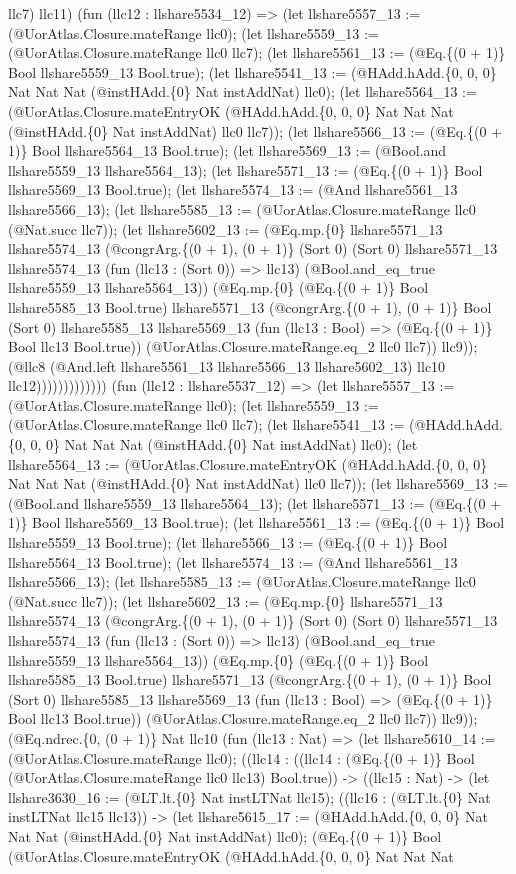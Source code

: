 \documentclass[11pt]{article}
\begin{document}
llc7) llc11) (fun (llc12 : llshare5534\_12) => (let llshare5557\_13 := (@UorAtlas.Closure.mateRange llc0); (let llshare5559\_13 := (@UorAtlas.Closure.mateRange llc0 llc7); (let llshare5561\_13 := (@Eq.\{(0 + 1)\} Bool llshare5559\_13 Bool.true); (let llshare5541\_13 := (@HAdd.hAdd.\{0, 0, 0\} Nat Nat Nat (@instHAdd.\{0\} Nat instAddNat) llc0); (let llshare5564\_13 := (@UorAtlas.Closure.mateEntryOK (@HAdd.hAdd.\{0, 0, 0\} Nat Nat Nat (@instHAdd.\{0\} Nat instAddNat) llc0 llc7)); (let llshare5566\_13 := (@Eq.\{(0 + 1)\} Bool llshare5564\_13 Bool.true); (let llshare5569\_13 := (@Bool.and llshare5559\_13 llshare5564\_13); (let llshare5571\_13 := (@Eq.\{(0 + 1)\} Bool llshare5569\_13 Bool.true); (let llshare5574\_13 := (@And llshare5561\_13 llshare5566\_13); (let llshare5585\_13 := (@UorAtlas.Closure.mateRange llc0 (@Nat.succ llc7)); (let llshare5602\_13 := (@Eq.mp.\{0\} llshare5571\_13 llshare5574\_13 (@congrArg.\{(0 + 1), (0 + 1)\} (Sort 0) (Sort 0) llshare5571\_13 llshare5574\_13 (fun (llc13 : (Sort 0)) => llc13) (@Bool.and\_eq\_true llshare5559\_13 llshare5564\_13)) (@Eq.mp.\{0\} (@Eq.\{(0 + 1)\} Bool llshare5585\_13 Bool.true) llshare5571\_13 (@congrArg.\{(0 + 1), (0 + 1)\} Bool (Sort 0) llshare5585\_13 llshare5569\_13 (fun (llc13 : Bool) => (@Eq.\{(0 + 1)\} Bool llc13 Bool.true)) (@UorAtlas.Closure.mateRange.eq\_2 llc0 llc7)) llc9)); (@llc8 (@And.left llshare5561\_13 llshare5566\_13 llshare5602\_13) llc10 llc12))))))))))))) (fun (llc12 : llshare5537\_12) => (let llshare5557\_13 := (@UorAtlas.Closure.mateRange llc0); (let llshare5559\_13 := (@UorAtlas.Closure.mateRange llc0 llc7); (let llshare5541\_13 := (@HAdd.hAdd.\{0, 0, 0\} Nat Nat Nat (@instHAdd.\{0\} Nat instAddNat) llc0); (let llshare5564\_13 := (@UorAtlas.Closure.mateEntryOK (@HAdd.hAdd.\{0, 0, 0\} Nat Nat Nat (@instHAdd.\{0\} Nat instAddNat) llc0 llc7)); (let llshare5569\_13 := (@Bool.and llshare5559\_13 llshare5564\_13); (let llshare5571\_13 := (@Eq.\{(0 + 1)\} Bool llshare5569\_13 Bool.true); (let llshare5561\_13 := (@Eq.\{(0 + 1)\} Bool llshare5559\_13 Bool.true); (let llshare5566\_13 := (@Eq.\{(0 + 1)\} Bool llshare5564\_13 Bool.true); (let llshare5574\_13 := (@And llshare5561\_13 llshare5566\_13); (let llshare5585\_13 := (@UorAtlas.Closure.mateRange llc0 (@Nat.succ llc7)); (let llshare5602\_13 := (@Eq.mp.\{0\} llshare5571\_13 llshare5574\_13 (@congrArg.\{(0 + 1), (0 + 1)\} (Sort 0) (Sort 0) llshare5571\_13 llshare5574\_13 (fun (llc13 : (Sort 0)) => llc13) (@Bool.and\_eq\_true llshare5559\_13 llshare5564\_13)) (@Eq.mp.\{0\} (@Eq.\{(0 + 1)\} Bool llshare5585\_13 Bool.true) llshare5571\_13 (@congrArg.\{(0 + 1), (0 + 1)\} Bool (Sort 0) llshare5585\_13 llshare5569\_13 (fun (llc13 : Bool) => (@Eq.\{(0 + 1)\} Bool llc13 Bool.true)) (@UorAtlas.Closure.mateRange.eq\_2 llc0 llc7)) llc9)); (@Eq.ndrec.\{0, (0 + 1)\} Nat llc10 (fun (llc13 : Nat) => (let llshare5610\_14 := (@UorAtlas.Closure.mateRange llc0); ((llc14 : ((llc14 : (@Eq.\{(0 + 1)\} Bool (@UorAtlas.Closure.mateRange llc0 llc13) Bool.true)) -> ((llc15 : Nat) -> (let llshare3630\_16 := (@LT.lt.\{0\} Nat instLTNat llc15); ((llc16 : (@LT.lt.\{0\} Nat instLTNat llc15 llc13)) -> (let llshare5615\_17 := (@HAdd.hAdd.\{0, 0, 0\} Nat Nat Nat (@instHAdd.\{0\} Nat instAddNat) llc0); (@Eq.\{(0 + 1)\} Bool (@UorAtlas.Closure.mateEntryOK (@HAdd.hAdd.\{0, 0, 0\} Nat Nat Nat 
\end{document}
